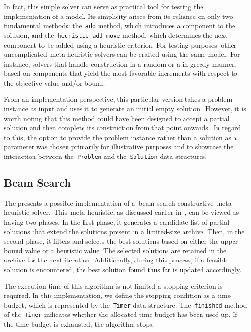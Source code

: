 In fact, this simple solver can serve as practical tool for testing the
implementation of a model. Its simplicity arises from its reliance on only two
fundamental methods: the~\texttt{add} method, which introduces a component to
the solution, and the~\texttt{heuristic\_add\_move} method, which determines the
next component to be added using a heuristic criterion. For testing purposes,
other uncomplicated~\acrshort{meta-heuristic} solvers can be crafted using the
same model. For instance, solvers that handle construction in a random or a
in greedy manner, based on components that yield the most favorable increments
with respect to the objective value and/or bound.

From an implementation perspective, this particular version takes a problem
instance as input and uses it to generate an initial empty solution.~However,
it is worth noting that this method could have been designed to accept a partial
solution and then complete its construction from that point onwards.~In regard
to this, the option to provide the problem instance rather than a solution as a
parameter was chosen primarily for illustrative purposes and to showcase the
interaction between the~\texttt{Problem} and the~\texttt{Solution} data structures.

\subsection{Beam Search}
\label{subsec:beam-search-solver}

The  presents a possible implementation of a~\acrshort{beam-search}
constructive~\acrshort{meta-heuristic} solver.~This~\acrshort{meta-heuristic},
as discussed earlier in~, can be viewed as having two phases. In the
first phase, it generates a candidate list of partial solutions that extend the
solutions present in a limited-size archive. Then, in the second phase, it
filters and selects the best solutions based on either the upper bound value or
a heuristic value. The selected solutions are retained in the archive for the
next iteration. Additionally, during this process, if a feasible solution is
encountered, the best solution found thus far is updated accordingly.

The execution time of this algorithm is not limited a stopping criterion is
required. In this implementation, we define the stopping condition as a time
budget, which is represented by the~\texttt{Timer} data structure.
The~\texttt{finished} method of the~\texttt{Timer} indicates whether the
allocated time budget has been used up. If the time budget is exhausted, the
algorithm stops.

